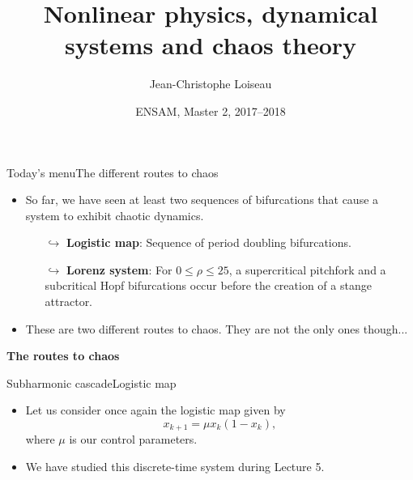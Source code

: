 \documentclass[usenames,dvipsnames,svgnames,10pt,aspectratio=169]{beamer}
\title[Nonlinear Physics] %
{
	Nonlinear physics, dynamical \\ systems and chaos theory
}
\author[J.-Ch.~Loiseau] %
{
	Jean-Christophe Loiseau
}
\institute[unused]
{
	\url{jean-christophe.loiseau@ensam.eu} \\
	DynFluid, \\
	Arts et M\'etiers ParisTech, France
}
\date[unused]{ENSAM, Master 2, 2017--2018}
\begin{document}
\titleframe %


\begin{frame}[t, c]{}{}

\end{frame}

\begin{frame}[t, c]{Today's menu}{The different routes to chaos}
	\begin{itemize}
		\item So far, we have seen at least two sequences of bifurcations that cause a system to exhibit chaotic dynamics.
		\begin{itemize}
			\item[$\hookrightarrow$] \alert{\textbf{Logistic map}}: Sequence of period doubling bifurcations.
			\item[$\hookrightarrow$] \alert{\textbf{Lorenz system}}: For $0 \leq \rho \leq 25$, a supercritical pitchfork and a subcritical Hopf bifurcations occur before the creation of a stange attractor.
		\end{itemize}

		\bigskip

		\item These are two different routes to chaos. They are not the only ones though...
	\end{itemize}

	\vspace{1cm}
\end{frame}

\begin{frame}[t, c]{}
	\centering
	\vspace{1cm}

	{\Large \textbf{The routes to chaos}}

	\bigskip

	{}

\end{frame}

\begin{frame}[t, c]{Subharmonic cascade}{Logistic map}
	\begin{itemize}
		\item Let us consider once again the logistic map given by
		$$x_{k+1} = \mu x_k ( 1 - x_k),$$
		where $\mu$ is our control parameters.

		\bigskip

		\item We have studied this discrete-time system during Lecture 5.
	\end{itemize}

	\vspace{1cm}
\end{frame}
\end{document}
